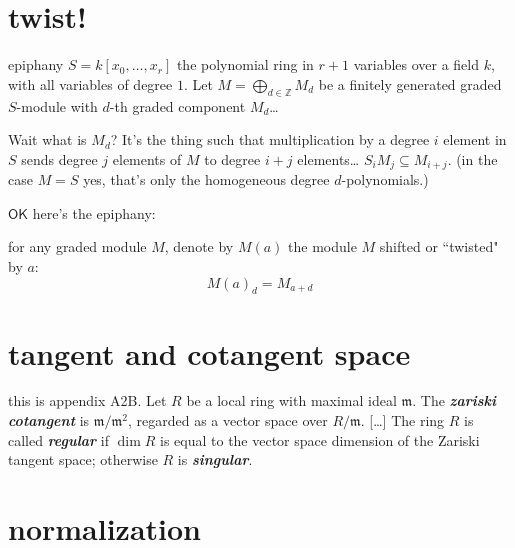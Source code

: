 \section{twist!}

\begin{thing6}{epiphany}\leavevmode
	\(S=k[x_0,\ldots,x_r]\) the polynomial ring in \(r+1\) variables over a field \(k\), with all variables of degree \(1\). Let \(M =\bigoplus_{d \in \mathbb{Z}}M_d\) be a finitely generated graded \(S\)-module with \(d\)-th graded component \(M_d\)…

	Wait what is  \(M_d\)? It's the thing such that multiplication by a degree \(i\) element in \(S\) sends degree \(j\) elements of \(M\) to degree \(i+j\) elements… \(S_i M_j \subseteq M_{i+j}\). (in the case \(M=S\) yes, that's only the homogeneous degree \(d\)-polynomials.)

	\(\mathsf{OK}\) here's the epiphany:
	\begin{tcolorbox}[colback=white,colframe=black,boxrule=0.5pt,sharp corners]
	for any graded module \(M\), denote by \(M(a)\) the module \(M\) shifted or ``twisted" by \(a\):
	\[M(a)_d=M_{a+d}\]
	
	\end{tcolorbox}
\end{thing6}

\section{tangent and cotangent space}

this is \cite{sys} appendix A2B. Let \(R\) be a local ring with maximal ideal \(\mathfrak{m}\). The \textit{\textbf{zariski cotangent}} is \(\mathfrak{m}/\mathfrak{m}^2\), regarded as a vector space over \(R/\mathfrak{m}\). […] The ring \(R\) is called \textit{\textbf{regular}} if \(\dim R\) is equal to the vector space dimension of the Zariski tangent space; otherwise \(R\) is \textit{\textbf{singular}}.

\section{normalization}

